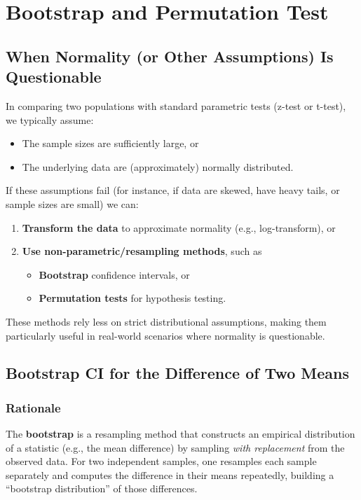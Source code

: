 \documentclass[10pt]{extarticle}
\begin{document}
\section{Bootstrap and Permutation Test}

\subsection{When Normality (or Other Assumptions) Is Questionable}

In comparing two populations with standard parametric tests (z-test or t-test), we typically assume:
\begin{itemize}
    \item The sample sizes are sufficiently large, or
    \item The underlying data are (approximately) normally distributed.
\end{itemize}
If these assumptions fail (for instance, if data are skewed, have heavy tails, or sample sizes are small) we can:
\begin{enumerate}
    \item \textbf{Transform the data} to approximate normality (e.g., log-transform), or
    \item \textbf{Use non-parametric/resampling methods}, such as 
    \begin{itemize}
        \item \textbf{Bootstrap} confidence intervals, or
        \item \textbf{Permutation tests} for hypothesis testing.
    \end{itemize}
\end{enumerate}
These methods rely less on strict distributional assumptions, making them particularly useful in real-world scenarios where normality is questionable.

\subsection{Bootstrap CI for the Difference of Two Means}

\subsubsection{Rationale}
The \textbf{bootstrap} is a resampling method that constructs an empirical distribution of a statistic (e.g., the mean difference) by sampling \emph{with replacement} from the observed data. For two independent samples, one resamples each sample separately and computes the difference in their means repeatedly, building a “bootstrap distribution” of those differences.
\end{document}
